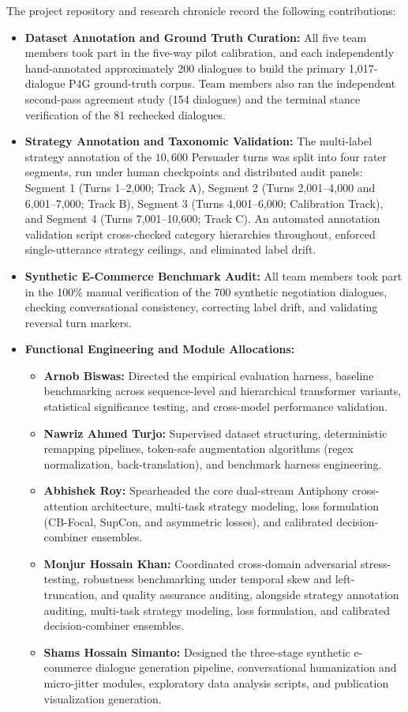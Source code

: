 The project repository and research chronicle record the following contributions:
\begin{itemize}
  \item \textbf{Dataset Annotation and Ground Truth Curation:} All five team members took part in the five-way pilot calibration, and each independently hand-annotated approximately 200 dialogues to build the primary 1,017-dialogue P4G ground-truth corpus. Team members also ran the independent second-pass agreement study (154 dialogues) and the terminal stance verification of the 81 rechecked dialogues.
  \item \textbf{Strategy Annotation and Taxonomic Validation:} The multi-label strategy annotation of the $10{,}600$ Persuader turns was split into four rater segments, run under human checkpoints and distributed audit panels: Segment 1 (Turns 1--2,000; Track A), Segment 2 (Turns 2,001--4,000 and 6,001--7,000; Track B), Segment 3 (Turns 4,001--6,000; Calibration Track), and Segment 4 (Turns 7,001--10,600; Track C). An automated annotation validation script cross-checked category hierarchies throughout, enforced single-utterance strategy ceilings, and eliminated label drift.
  \item \textbf{Synthetic E-Commerce Benchmark Audit:} All team members took part in the 100\% manual verification of the 700 synthetic negotiation dialogues, checking conversational consistency, correcting label drift, and validating reversal turn markers.
  \item \textbf{Functional Engineering and Module Allocations:}
    \begin{itemize}
      \item \textbf{Arnob Biswas:} Directed the empirical evaluation harness, baseline benchmarking across sequence-level and hierarchical transformer variants, statistical significance testing, and cross-model performance validation.
      \item \textbf{Nawriz Ahmed Turjo:} Supervised dataset structuring, deterministic remapping pipelines, token-safe augmentation algorithms (regex normalization, back-translation), and benchmark harness engineering.
      \item \textbf{Abhishek Roy:} Spearheaded the core dual-stream Antiphony cross-attention architecture, multi-task strategy modeling, loss formulation (CB-Focal, SupCon, and asymmetric losses), and calibrated decision-combiner ensembles.
      \item \textbf{Monjur Hossain Khan:} Coordinated cross-domain adversarial stress-testing, robustness benchmarking under temporal skew and left-truncation, and quality assurance auditing, alongside strategy annotation auditing, multi-task strategy modeling, loss formulation, and calibrated decision-combiner ensembles.
      \item \textbf{Shams Hossain Simanto:} Designed the three-stage synthetic e-commerce dialogue generation pipeline, conversational humanization and micro-jitter modules, exploratory data analysis scripts, and publication visualization generation.
    \end{itemize}
\end{itemize}

